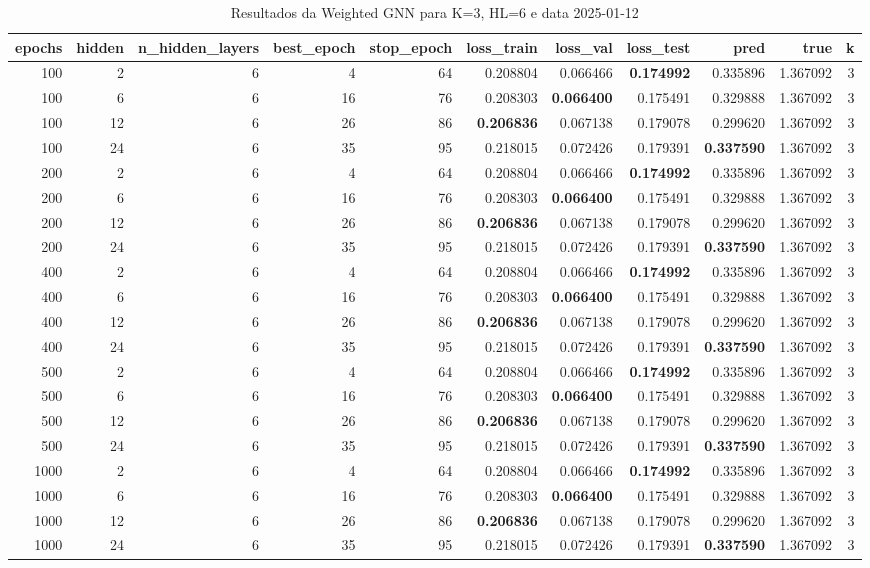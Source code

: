 \begin{table}
\caption{Resultados da Weighted GNN para K=3, HL=6 e data 2025-01-12}
\label{tab:weighted_gnn_results_k3_hl6_d20250112}
\begin{tabular}{rrrrrrrrrrr}
\toprule
epochs & hidden & n\_hidden\_layers & best\_epoch & stop\_epoch & loss\_train & loss\_val & loss\_test & pred & true & k \\
\midrule
100 & 2 & 6 & 4 & 64 & 0.208804 & 0.066466 & \textbf{0.174992} & 0.335896 & 1.367092 & 3 \\
100 & 6 & 6 & 16 & 76 & 0.208303 & \textbf{0.066400} & 0.175491 & 0.329888 & 1.367092 & 3 \\
100 & 12 & 6 & 26 & 86 & \textbf{0.206836} & 0.067138 & 0.179078 & 0.299620 & 1.367092 & 3 \\
100 & 24 & 6 & 35 & 95 & 0.218015 & 0.072426 & 0.179391 & \textbf{0.337590} & 1.367092 & 3 \\
200 & 2 & 6 & 4 & 64 & 0.208804 & 0.066466 & \textbf{0.174992} & 0.335896 & 1.367092 & 3 \\
200 & 6 & 6 & 16 & 76 & 0.208303 & \textbf{0.066400} & 0.175491 & 0.329888 & 1.367092 & 3 \\
200 & 12 & 6 & 26 & 86 & \textbf{0.206836} & 0.067138 & 0.179078 & 0.299620 & 1.367092 & 3 \\
200 & 24 & 6 & 35 & 95 & 0.218015 & 0.072426 & 0.179391 & \textbf{0.337590} & 1.367092 & 3 \\
400 & 2 & 6 & 4 & 64 & 0.208804 & 0.066466 & \textbf{0.174992} & 0.335896 & 1.367092 & 3 \\
400 & 6 & 6 & 16 & 76 & 0.208303 & \textbf{0.066400} & 0.175491 & 0.329888 & 1.367092 & 3 \\
400 & 12 & 6 & 26 & 86 & \textbf{0.206836} & 0.067138 & 0.179078 & 0.299620 & 1.367092 & 3 \\
400 & 24 & 6 & 35 & 95 & 0.218015 & 0.072426 & 0.179391 & \textbf{0.337590} & 1.367092 & 3 \\
500 & 2 & 6 & 4 & 64 & 0.208804 & 0.066466 & \textbf{0.174992} & 0.335896 & 1.367092 & 3 \\
500 & 6 & 6 & 16 & 76 & 0.208303 & \textbf{0.066400} & 0.175491 & 0.329888 & 1.367092 & 3 \\
500 & 12 & 6 & 26 & 86 & \textbf{0.206836} & 0.067138 & 0.179078 & 0.299620 & 1.367092 & 3 \\
500 & 24 & 6 & 35 & 95 & 0.218015 & 0.072426 & 0.179391 & \textbf{0.337590} & 1.367092 & 3 \\
1000 & 2 & 6 & 4 & 64 & 0.208804 & 0.066466 & \textbf{0.174992} & 0.335896 & 1.367092 & 3 \\
1000 & 6 & 6 & 16 & 76 & 0.208303 & \textbf{0.066400} & 0.175491 & 0.329888 & 1.367092 & 3 \\
1000 & 12 & 6 & 26 & 86 & \textbf{0.206836} & 0.067138 & 0.179078 & 0.299620 & 1.367092 & 3 \\
1000 & 24 & 6 & 35 & 95 & 0.218015 & 0.072426 & 0.179391 & \textbf{0.337590} & 1.367092 & 3 \\
\bottomrule
\end{tabular}
\end{table}

